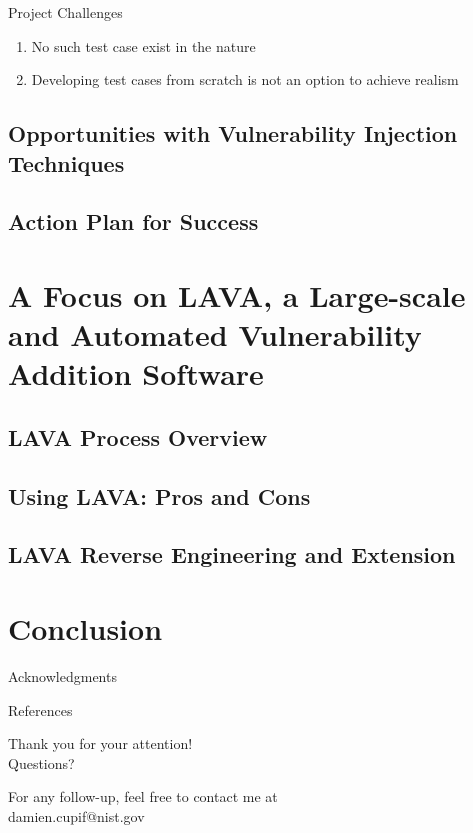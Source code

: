 \documentclass[aspectratio=169]{beamer}
\begin{document}
  \begin{frame}{Project Challenges}
    \begin{enumerate}
    \item No such test case exist in the nature
    \item Developing test cases from scratch is not an option to achieve realism
    \end{enumerate}
  \end{frame}
  
  \subsection{Opportunities with Vulnerability Injection Techniques}
  \subsection{Action Plan for Success}

  \section{A Focus on LAVA, a Large-scale and Automated Vulnerability Addition Software}
  \subsection{LAVA Process Overview}
  \subsection{Using LAVA: Pros and Cons}
  \subsection{LAVA Reverse Engineering and Extension}

  \section*{Conclusion}
  
  \begin{frame}{Acknowledgments}
  \end{frame}

  \begin{frame}{References}
  \end{frame}

  \begin{frame}[standout]
    \begin{huge}
      Thank you for your attention!\\\alert{Questions?\\}
    \end{huge}
    \vspace{2.5em}
    \begin{scriptsize}
      For any follow-up, feel free to contact me at\\
      damien.cupif@nist.gov
    \end{scriptsize}
  \end{frame}

  
\end{document}
